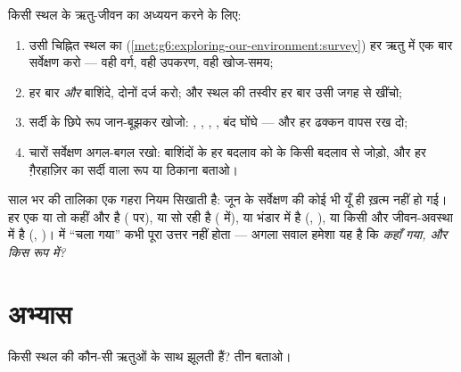 \begin{method}[साल भर का सर्वेक्षण]\label{met:g6:life-through-seasons:yearsurvey}
किसी स्थल के ऋतु-जीवन का अध्ययन करने के लिए:
\begin{enumerate}
  \item उसी चिह्नित स्थल का
        (\cref{met:g6:exploring-our-environment:survey})
        हर ऋतु में एक बार सर्वेक्षण करो --- वही वर्ग, वही उपकरण,
        वही खोज-समय;
  \item हर बार  \emph{और} बाशिंदे, दोनों दर्ज करो; और
        स्थल की तस्वीर हर बार उसी जगह से खींचो;
  \item सर्दी के छिपे रूप जान-बूझकर खोजो: , , ,
        , बंद घोंघे --- और हर ढक्कन वापस रख दो;
  \item चारों सर्वेक्षण अगल-बगल रखो: बाशिंदों के हर बदलाव को
         के किसी बदलाव से जोड़ो, और हर ग़ैरहाज़िर का सर्दी
        वाला रूप या ठिकाना बताओ।
\end{enumerate}
\end{method}

\begin{remark}[कुछ भी यूँ ही ग़ायब नहीं होता]\label{rem:g6:life-through-seasons:vanish}
साल भर की तालिका एक गहरा नियम सिखाती है: जून के सर्वेक्षण की कोई भी
 यूँ ही ख़त्म नहीं हो गई। हर एक या तो कहीं और है ( पर),
या सो रही है ( में), या भंडार में है (, ), या किसी
और जीवन-अवस्था में है (, )।  में ``चला गया'' कभी
पूरा उत्तर नहीं होता --- अगला सवाल हमेशा यह है कि \emph{कहाँ गया, और
किस रूप में?}
\end{remark}

\section{अभ्यास}

\begin{exercise}[$\star$]\label{exo:g6:life-through-seasons:1}
किसी स्थल की कौन-सी  ऋतुओं के साथ झूलती हैं? तीन बताओ।
\end{exercise}

